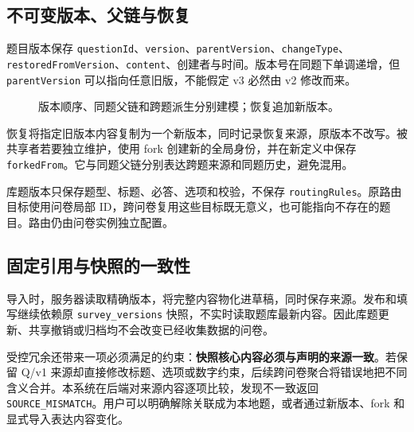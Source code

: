 \documentclass[UTF8,10pt,a4paper,twocolumn,fontset=none]{ctexart}
\newcommand{\term}[1]{\textbf{#1}}
\begin{document}
\subsection{不可变版本、父链与恢复}
题目版本保存 \texttt{questionId}、\texttt{version}、\texttt{parentVersion}、\texttt{changeType}、\texttt{restoredFromVersion}、\texttt{content}、创建者与时间。版本号在同题下单调递增，但 \texttt{parentVersion} 可以指向任意旧版，不能假定 v3 必然由 v2 修改而来。

\begin{figure}[t]
\centering
{}
\caption{版本顺序、同题父链和跨题派生分别建模；恢复追加新版本。}
\label{fig:lineage}
\end{figure}

恢复将指定旧版本内容复制为一个新版本，同时记录恢复来源，原版本不改写。被共享者若要独立维护，使用 fork 创建新的全局身份，并在新定义中保存 \texttt{forkedFrom}。它与同题父链分别表达跨题来源和同题历史，避免混用。

库题版本只保存题型、标题、必答、选项和校验，不保存 \texttt{routingRules}。原路由目标使用问卷局部 ID，跨问卷复用这些目标既无意义，也可能指向不存在的题目。路由仍由问卷实例独立配置。

\subsection{固定引用与快照的一致性}
导入时，服务器读取精确版本，将完整内容物化进草稿，同时保存来源。发布和填写继续依赖原 \texttt{survey\_versions} 快照，不实时读取题库最新内容。因此库题更新、共享撤销或归档均不会改变已经收集数据的问卷。

受控冗余还带来一项必须满足的约束：\term{快照核心内容必须与声明的来源一致}。若保留 Q/v1 来源却直接修改标题、选项或数字约束，后续跨问卷聚合将错误地把不同含义合并。本系统在后端对来源内容逐项比较，发现不一致返回 \texttt{SOURCE\_MISMATCH}。用户可以明确解除关联成为本地题，或者通过新版本、fork 和显式导入表达内容变化。
\end{document}
